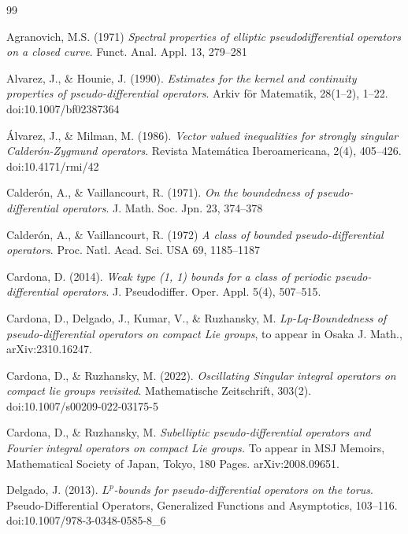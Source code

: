 \documentclass[12pt, reqno]{amsart}
\theoremstyle{definition}
\theoremstyle{remark}
\numberwithin{equation}{section}
\begin{document}

\begin{thebibliography}{99}

Agranovich, M.S. (1971) \textit{Spectral properties of elliptic pseudodifferential operators on a closed curve}. Funct.
Anal. Appl. 13, 279–281 

Alvarez, J., \& Hounie, J. (1990). \textit{Estimates for the kernel and continuity properties of pseudo-differential operators}. {Arkiv för Matematik, 28}(1–2), 1–22. doi:10.1007/bf02387364 

Álvarez, J., \& Milman, M. (1986). \textit{Vector valued inequalities for strongly singular Calderón-Zygmund operators}. Revista Matemática Iberoamericana, 2(4), 405–426. doi:10.4171/rmi/42 

Calderón, A., \& Vaillancourt, R. (1971). \textit{On the boundedness of pseudo-differential operators}. J. Math. Soc. Jpn.
23, 374–378 

Calderón, A., \& Vaillancourt, R. (1972) \textit{A class of bounded pseudo-differential operators}. Proc. Natl. Acad. Sci.
USA 69, 1185–1187

Cardona, D. (2014). \textit{Weak type (1, 1) bounds for a class of periodic pseudo-differential operators}. J. Pseudodiffer. Oper. Appl. 5(4), 507–515.

Cardona, D., Delgado, J., Kumar, V., \& Ruzhansky, M. \textit{Lp-Lq-Boundedness of pseudo-differential operators on compact Lie groups}, to appear in Osaka J. Math., arXiv:2310.16247.



Cardona, D., \& Ruzhansky, M. (2022). \textit{Oscillating Singular integral operators on compact lie groups revisited}. Mathematische Zeitschrift, 303(2). doi:10.1007/s00209-022-03175-5 

Cardona, D., \& Ruzhansky, M. \textit{Subelliptic pseudo-differential operators and Fourier integral operators on compact Lie groups.} To appear in MSJ Memoirs, Mathematical Society of Japan, Tokyo, 180 Pages. arXiv:2008.09651.

Delgado, J. (2013). \textit{$L^p$-bounds for pseudo-differential operators on the torus}. Pseudo-Differential Operators, Generalized Functions and Asymptotics, 103–116. doi:10.1007/978-3-0348-0585-8\_6 


\end{thebibliography}
\end{document}
